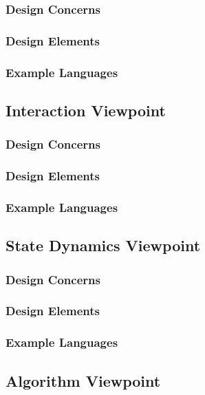\documentclass[onecolumn, draftclsnofoot,10pt, compsoc]{IEEEtran}
\begin{document}
\subsubsection{Design Concerns}

\subsubsection{Design Elements}

\subsubsection{Example Languages}

\subsection{Interaction Viewpoint}
\subsubsection{Design Concerns}

\subsubsection{Design Elements}

\subsubsection{Example Languages}

\subsection{State Dynamics Viewpoint}
\subsubsection{Design Concerns}

\subsubsection{Design Elements}

\subsubsection{Example Languages}

\subsection{Algorithm Viewpoint}
\end{document}
